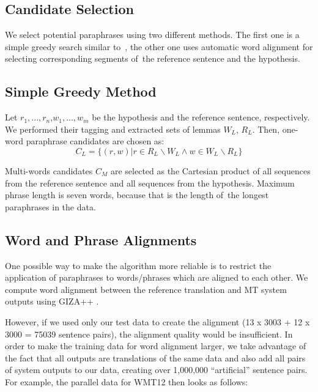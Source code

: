 \documentclass[11pt]{article}
\def\equo#1{``#1''}
\begin{document}
\subsection{Candidate Selection}
We select potential paraphrases using two different methods. The first one is a 
simple greedy search similar to~, the other one uses automatic 
word alignment for selecting corresponding segments of~the reference sentence 
and the hypothesis.

\subsection*{Simple Greedy Method}
Let $ r_1,..., r_n $,$ w_1,...,w_m $ be the hypothesis and the reference 
sentence, respectively. We performed their tagging and extracted sets of lemmas 
$ W_{L} $, $ R_{L} $. Then, one-word paraphrase candidates are chosen as:
$$ C_{L} = \lbrace (r,w) | r \in R_{L} \smallsetminus W_{L} \wedge w \in W_{L}
\smallsetminus R_{L}  \rbrace $$

Multi-words candidates $ C_M $ are selected as the Cartesian product of all 
sequences from the reference sentence and all sequences from the hypothesis. 
Maximum phrase length is seven words, because that is the length of~the longest
paraphrases in the data. %
%

\subsection*{Word and Phrase Alignments}
One possible way to make the algorithm more reliable is to restrict the 
application of paraphrases to words/phrases which are aligned to each other. We 
compute word alignment between the reference translation and MT system outputs 
using GIZA++ \cite{gizapp}.

However, if we used only our test data to create the alignment (13 x 3003 + 12 
x 3000 = 75039 sentence pairs), the alignment quality would be insufficient. In 
order to make the training data for word alignment larger, we take advantage of 
the fact that all outputs are translations of the same data and also add all 
pairs of system outputs to our data, creating over 1,000,000 \equo{artificial} 
sentence pairs. For example, the parallel data for WMT12 then looks as follows:
\end{document}
